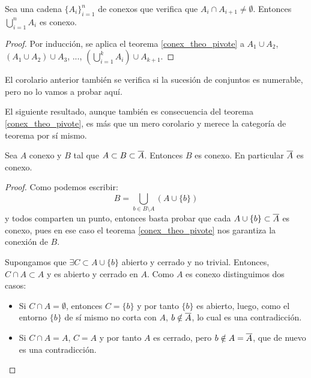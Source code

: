 \begin{cor}
	Sea una cadena $\{A_i\}_{i=1}^n$ de conexos que verifica que $A_i\cap A_{i+1}\neq\emptyset$. Entonces $\bigcup_{i=1}^n A_i$ es conexo.
	
	\begin{proof}
		Por inducción, se aplica el teorema \ref{conex_theo_pivote} a $A_1\cup A_2$, $(A_1\cup A_2)\cup A_3$, ..., $\left(\bigcup_{i=1}^k A_i\right)\cup A_{k+1}$.
	\end{proof}
\end{cor}

\begin{obs}
	El corolario anterior también se verifica si la sucesión de conjuntos es numerable, pero no lo vamos a probar aquí.
\end{obs}

El siguiente resultado, aunque también es consecuencia del teorema \ref{conex_theo_pivote}, es más que un mero corolario y merece la categoría de teorema por sí mismo.

\begin{theo}\label{T7:teo_adherencia_conexa}
	Sea $A$ conexo y $B$ tal que $A\subset B\subset\overline{A}$. Entonces $B$ es conexo. En particular $\overline{A}$ es conexo.
	
	\begin{proof}
		Como podemos escribir:
		\[B=\bigcup_{b\in B\setminus A} (A\cup\{b\}) \]
		y todos comparten un punto, entonces basta probar que cada $A\cup\{b\}\subset\overline{A}$ es conexo, pues en ese caso el teorema \ref{conex_theo_pivote} nos garantiza la conexión de $B$.
		
		Supongamos que $\exists C\subset A\cup\{b\}$ abierto y cerrado y no trivial. Entonces, $C\cap A\subset A$ y es abierto y cerrado en $A$. Como $A$ es conexo distinguimos dos casos:
		
		\begin{itemize}
			\item Si $C\cap A=\emptyset$, entonces $C=\{b\}$ y por tanto $\{b\}$ es abierto, luego, como el entorno $\{b\}$ de sí mismo no corta con $A$, $b\notin\overline{A}$, lo cual es una contradicción.
			\item Si $C\cap A=A$, $C=A$ y por tanto $A$ es cerrado, pero $b\notin A=\overline{A}$, que de nuevo es una contradicción. \qedhere
		\end{itemize}
	\end{proof}
\end{theo}

